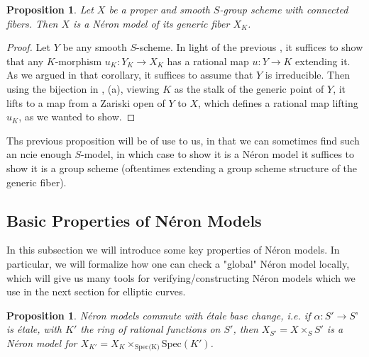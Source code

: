 \documentclass{article}
\theoremstyle{definition}
\theoremstyle{remark}
\theoremstyle{plain}
\newtheorem{proposition}[theorem]{Proposition}
\begin{document}
\begin{proposition}\label{prop:2.7}
	Let $X$ be a proper and smooth $S$-group scheme with connected fibers. 
	Then $X$ is a N\'eron model of its generic fiber $X_K$.
\end{proposition}

\begin{proof}
	Let $Y$ be any smooth $S$-scheme.
	In light of the previous , it suffices to show that any $K$-morphism $u_K: Y_K \to X_K$ has a rational map $u: Y \to K$ extending it.
	As we argued in that corollary, it suffices to assume that $Y$ is irreducible.
	Then using the bijection in , (a), viewing $K$ as the stalk of the generic point of $Y$, it lifts to a map from a Zariski open of $Y$ to $X$, which defines a rational map lifting $u_K$, as we wanted to show.

\end{proof}

Ths previous proposition will be of use to us, in that we can sometimes find such an ncie enough $S$-model, in which case to show it is a N\'eron model it suffices to show it is a group scheme (oftentimes extending a group scheme structure of the generic fiber).

\subsection{Basic Properties of N\'eron Models}

In this subsection we will introduce some key properties of N\'eron models. 
In particular, we will formalize how one can check a "global" N\'eron model locally, which will give us many tools for verifying/constructing N\'eron models which we use in the next section for elliptic curves.

\begin{proposition}\label{etale-basechange}
	N\'eron models commute with \'etale base change, i.e. if $\alpha: S' \to S’$ is  \'etale, with $K'$ the ring of rational functions on $S'$, then $X_{S'} = X \times_S S'$ is a N\'eron model for $X_{K'} = X_K \times_{\text{Spec(K)}} \text{Spec}(K')$. 
\end{proposition}
\end{document}
